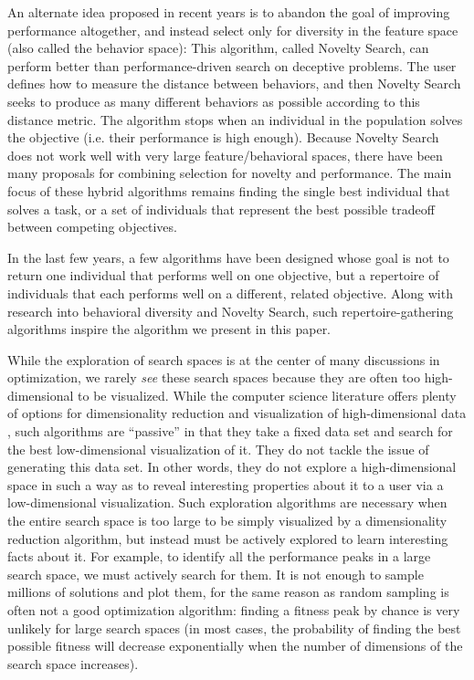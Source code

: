 \documentclass[twocolumn, DIV25, 9pt]{scrartcl}
\begin{document}
An alternate idea proposed in recent years is to abandon the goal of improving performance altogether, and instead select only for diversity in the feature space (also called the behavior space): This algorithm, called Novelty Search, can perform better than performance-driven search on deceptive problems\cite{lehman2011abandoning, lehman2011evolving, lehman2011novelty, lehman2008exploiting}. The user defines how to measure the distance between behaviors, and then Novelty Search seeks to produce as many different behaviors as possible according to this distance metric. The algorithm stops when an individual in the population solves the objective (i.e. their performance is high enough). Because Novelty Search does not work well with very large feature/behavioral spaces\cite{lehman2010revising,cuccu2011novelty}, there have been many proposals for combining selection for novelty and performance\cite{gomes2015devising, mouret2011novelty, cuccu2011novelty, inden2013examination}. The main focus of these hybrid algorithms remains finding the single best individual that solves a task, or a set of individuals that represent the best possible tradeoff between competing objectives. 

In the last few years, a few algorithms have been designed whose goal is not to return one individual that performs well on one objective, but a repertoire of individuals that each performs well on a different, related objective\cite{clune2013originModularity, lehman2011evolving, cully2015evolving}. Along with research into behavioral diversity and Novelty Search, such repertoire-gathering algorithms inspire the algorithm we present in this paper. 

While the exploration of search spaces is at the center of many discussions in optimization, we rarely \emph{see} these search spaces because they are often too high-dimensional to be visualized. While the computer science literature offers plenty of options for dimensionality reduction and visualization of high-dimensional data \cite{tenenbaum2000global,Haykin1998,kohonen2001self,andrews1972plots}, such algorithms are ``passive'' in that they take a fixed data set and search for the best low-dimensional visualization of it. They do not tackle the issue of generating this data set. In other words, they do not explore a high-dimensional space in such a way as to reveal interesting properties about it to a user via a low-dimensional visualization. Such exploration algorithms are necessary when the entire search space is too large to be simply visualized by a dimensionality reduction algorithm, but instead must be actively explored to learn interesting facts about it. For example, to identify all the performance peaks in a large search space, we must actively search for them. It is not enough to sample millions of solutions and plot them, for the same reason as random sampling is often not a good optimization algorithm: finding a fitness peak by chance is very unlikely for  large search spaces (in most cases, the probability of finding the best possible fitness will decrease exponentially when the number of dimensions of the search space increases).
\end{document}
